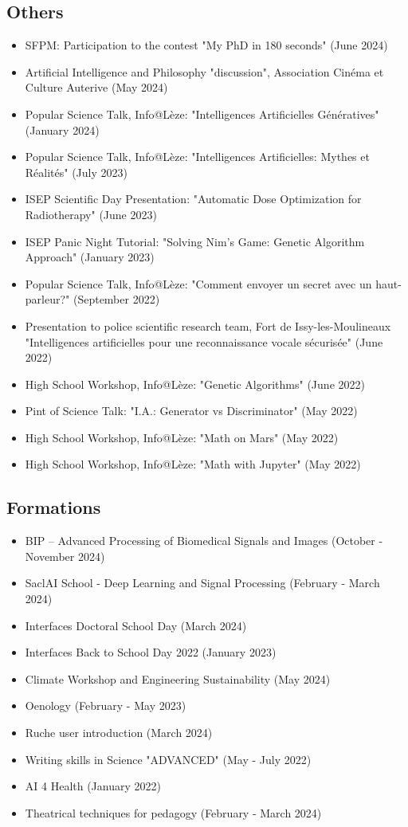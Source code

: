 \subsection*{Others}
\begin{itemize}
	\item SFPM: Participation to the contest "My PhD in 180 seconds" (June 2024)
	\item Artificial Intelligence and Philosophy "discussion", Association Cinéma et Culture Auterive (May 2024) 
	\item Popular Science Talk, Info@Lèze: "Intelligences Artificielles Génératives" (January 2024)
	\item Popular Science Talk, Info@Lèze: "Intelligences Artificielles: Mythes et Réalités" (July 2023)	\item ISEP Scientific Day Presentation: "Automatic Dose Optimization for Radiotherapy" (June 2023)
	\item ISEP Panic Night Tutorial: "Solving Nim's Game: Genetic Algorithm Approach" (January 2023)
	\item Popular Science Talk, Info@Lèze: "Comment envoyer un secret avec un haut-parleur?" (September 2022)
	\item Presentation to police scientific research team, Fort de Issy-les-Moulineaux "Intelligences artificielles pour une reconnaissance vocale sécurisée" (June 2022)
	\item High School Workshop, Info@Lèze: "Genetic Algorithms" (June 2022)
	\item Pint of Science Talk: "I.A.: Generator vs Discriminator" (May 2022)
	\item High School Workshop, Info@Lèze: "Math on Mars" (May 2022)
	\item High School Workshop, Info@Lèze: "Math with Jupyter" (May 2022)
\end{itemize}

\subsection*{Formations}
\begin{itemize}
	\item BIP – Advanced Processing of Biomedical Signals and Images (October - November 2024)
	\item SaclAI School - Deep Learning and Signal Processing (February - March 2024)
	\item Interfaces Doctoral School Day (March 2024)
	\item Interfaces Back to School Day 2022 (January 2023)
	\item Climate Workshop and Engineering Sustainability (May 2024)
	\item Oenology (February - May 2023)
	\item Ruche user introduction (March 2024)
	\item Writing skills in Science "ADVANCED" (May - July 2022)
	\item AI 4 Health (January 2022)
	\item Theatrical techniques for pedagogy (February - March 2024)
\end{itemize}